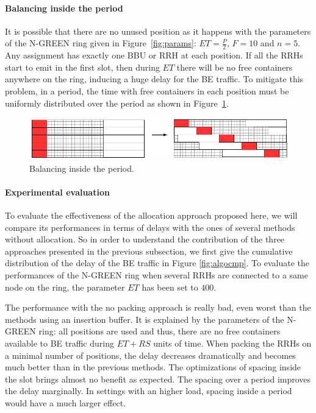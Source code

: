\documentclass[10pt, conference, letterpaper]{IEEEtran}
\begin{document}
\paragraph{Balancing inside the period}

It is possible that there are no unused position as it happens with the parameters of the N-GREEN ring given in Figure~\ref{fig:params}: $ET = \frac{P}{2}$, $F = 10$ and $n = 5$. Any assignment has exactly one  BBU or RRH at each position. If all the RRHs start to emit in the first slot, then during $ET$ there will be no free containers anywhere on the ring, inducing a huge delay for the BE traffic.
To mitigate this problem, in a period, the time with free containers in each position must be uniformly distributed over the period as shown in  Figure~\ref{fig:periodbal}.
\begin{figure}[h!]
\begin{center}

      \includegraphics[scale=0.55]{repart2}
     \caption{Balancing inside the period.}\label{fig:periodbal}

\end{center}
  \end{figure}
  \paragraph{Experimental evaluation}

To evaluate the effectiveness of the allocation approach proposed here, we will compare its performances in terms of delays with the ones of several methods without allocation. So in order to understand the contribution of the three approaches presented in the previous subsection, we first give the cumulative distribution of the delay of the BE traffic  in Figure \ref{fig:algocmp}. To evaluate the performances of  the  N-GREEN ring when   several RRHs are connected to a same node on the ring, the parameter $ET$ has been set to $400$.

The performance with the no packing approach is really bad, even worst than the methods using an insertion buffer. It is explained by the parameters of the N-GREEN ring: all positions are used and thus, there are no free containers available to BE traffic during $ET+RS$ units of time. When packing the RRHs on a minimal number of positions, the delay decreases dramatically and becomes much better than in the previous methods. The optimizations of spacing inside the slot brings almost no benefit as expected. The spacing over a period improves the delay marginally. In settings with an higher load, spacing inside a period would have a much larger effect.
\end{document}
